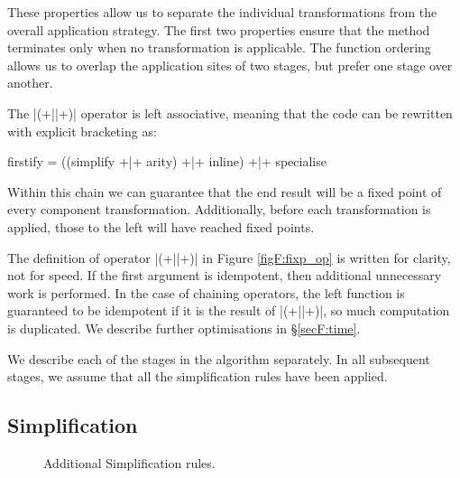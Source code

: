 These properties allow us to separate the individual transformations from the overall application strategy. The first two properties ensure that the method terminates only when no transformation is applicable. The function ordering allows us to overlap the application sites of two stages, but prefer one stage over another.

The |(+||+)| operator is left associative, meaning that the code can be rewritten with explicit bracketing as:

\begin{code}
firstify = ((simplify +|+ arity) +|+ inline) +|+ specialise
\end{code}

Within this chain we can guarantee that the end result will be a fixed point of every component transformation. Additionally, before each transformation is applied, those to the left will have reached fixed points.

The definition of operator |(+||+)| in Figure \ref{figF:fixp_op} is written for clarity, not for speed. If the first argument is idempotent, then additional unnecessary work is performed. In the case of chaining operators, the left function is guaranteed to be idempotent if it is the result of |(+||+)|, so much computation is duplicated. We describe further optimisations in \S\ref{secF:time}.

We describe each of the stages in the algorithm separately. In all subsequent stages, we assume that all the simplification rules have been applied.


\subsection{Simplification}
\label{secF:simplification_detail}

\begin{figure}
\begin{simplify}





\end{simplify}
\caption{Additional Simplification rules.}
\label{figF:lambda_simplify}
\end{figure}

